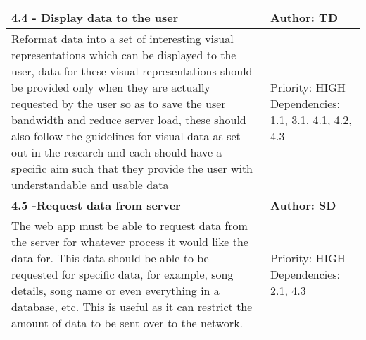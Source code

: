 \documentclass[12pt]{report}
\begin{document}
\begin{tabular}{| p{10cm} | p{3cm} |}
\hline
\textbf{4.4 - Display data to the user} & \textbf{Author: TD} \\
\hline
Reformat data into a set of interesting visual representations which can be displayed to the user, data for these visual representations should be provided only when they are actually requested by the user so as to save the user bandwidth and reduce server load, these should also follow the guidelines for visual data as set out in the research and each should have a specific aim such that they provide the user with understandable and usable data &  Priority: HIGH Dependencies: 1.1, 3.1, 4.1, 4.2, 4.3 \\
\hline
\textbf{4.5 -Request data from server} & \textbf{Author: SD} \\
\hline
The web app must be able to request data from the server for whatever process it would like the data for. This data should be able to be requested for specific data, for example, song details, song name or even everything in a database, etc. This is useful as it can restrict the amount of data to be sent over to the network. & Priority: HIGH Dependencies: 2.1, 4.3 \\
\hline

\end{tabular}

{}

\end{document}
